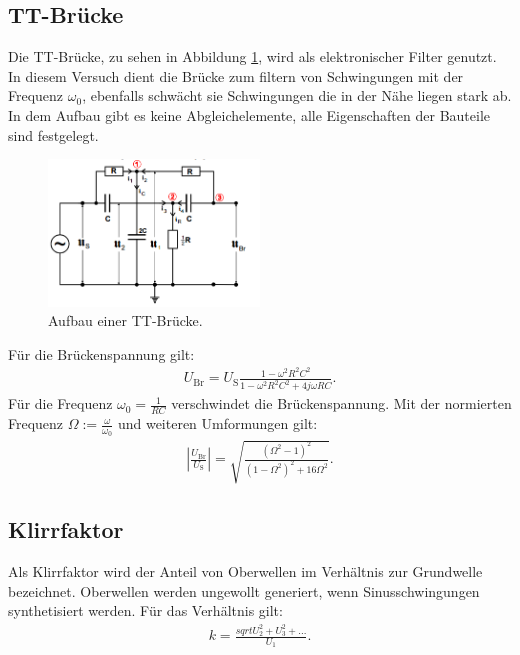 \subsection{TT-Brücke}
Die TT-Brücke, zu sehen in Abbildung \ref{fig:tt}, wird als elektronischer Filter genutzt.
In diesem Versuch dient die Brücke zum filtern von Schwingungen mit der Frequenz $\omega_0$, ebenfalls schwächt sie Schwingungen die in der Nähe liegen stark ab.
In dem Aufbau gibt es keine Abgleichelemente, alle Eigenschaften der Bauteile sind festgelegt.
\begin{figure}
 \centering
 \includegraphics[width=0.5\textwidth]{tt.PNG}
 \caption{Aufbau einer TT-Brücke.}
 \label{fig:tt}
 \end{figure}
Für die Brückenspannung gilt:
\begin{align}
  U_\mathrm{Br}=U_\mathrm{S}\frac{1-\omega^2 R^2 C^2}{1-\omega^2 R^2 C^2 + 4j \omega R C}\label{eqn:ubr}.
\end{align}
Für die Frequenz $\omega_0=\frac{1}{RC}$ verschwindet die Brückenspannung.
Mit der normierten Frequenz $\Omega:=\frac{\omega}{\omega_0}$ und weiteren Umformungen gilt:
\begin{align}
  \left|\frac{U_\mathrm{Br}}{U_\mathrm{S}}\right|=\sqrt{\frac{\left(\Omega^2-1\right)^2}{\left(1-\Omega^2\right)^2+16\Omega^2}}\label{eqn:TT}.
\end{align}
\subsection{Klirrfaktor}
Als Klirrfaktor wird der Anteil von Oberwellen im Verhältnis zur Grundwelle bezeichnet. Oberwellen werden ungewollt generiert, wenn Sinusschwingungen synthetisiert werden.
Für das Verhältnis gilt:
\begin{align}
  k=\frac{sqrt{U_2^2+U_3^2+...}}{U_1}\label{eqn:klirr}.
\end{align}
